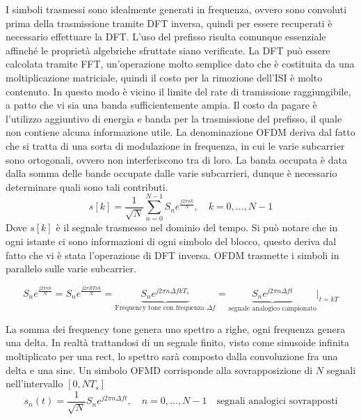 


I simboli trasmessi sono idealmente generati in frequenza, ovvero sono convoluti prima della trasmissione tramite DFT inversa, quindi per essere recuperati è necessario effettuare la DFT. L'uso del prefisso risulta comunque essenziale affinché le proprietà algebriche sfruttate siano verificate. 
La DFT può essere calcolata tramite FFT, un'operazione molto semplice dato che è costituita da una moltiplicazione matriciale, quindi il costo per la rimozione dell'ISI è molto contenuto. In questo modo è vicino il limite del rate di tramissione raggiungibile, a patto che vi sia una banda sufficientemente ampia.
Il costo da pagare è l'utilizzo aggiuntivo di energia e banda per la trasmissione del prefisso, il quale non contiene alcuna informazione utile.
La denominazione OFDM deriva dal fatto che si tratta di una sorta di modulazione in frequenza, in cui le varie subcarrier sono ortogonali, ovvero non interferiscono tra di loro. La banda occupata è data dalla somma delle bande occupate dalle varie subcarrieri, dunque è necessario determinare quali sono tali contributi.
\[
    s[k] = \frac{1}{\sqrt{N}} \sum_{n=0}^{N-1} S_n e^{\frac{j2\pi nk}{N}}, \quad k = 0, \ldots, N-1
\]
Dove $s[k]$ è il segnale trasmesso nel dominio del tempo. Si può notare che in ogni istante ci sono informazioni di ogni simbolo del blocco, questo deriva dal fatto che vi è stata l'operazione di DFT inversa. OFDM trasmette i simboli in parallelo sulle varie subcarrier. 

\[
    S_n e^{\frac{j2\pi nk}{N}} = S_n e^{\frac{j2\pi BTnk}{N}} = \underbrace{S_n e^{j2\pi n\Delta f k T_s}}_{\text{Frequency tone con frequenza $\Delta f$}} = \underbrace{S_n e^{j 2 \pi n \Delta f t}}_{\text{segnale analogico campionato}} \bigg|_{t=kT}
\]




La somma dei frequency tone genera uno spettro a righe, ogni frequenza genera una delta. In realtà trattandosi di un segnale finito, visto come sinusoide infinita moltiplicato per una rect, lo spettro sarà composto dalla convoluzione fra una delta e una sinc.
Un simbolo OFMD corrisponde alla sovrapposizione di $N$ segnali nell'intervallo $[0, NT_s]$
\[
    s_n(t) = \frac{1}{\sqrt{N}} S_n e^{j2\pi n \Delta f t}, \quad n = 0, \ldots, N-1 \quad \text{segnali analogici sovrapposti}
\]

